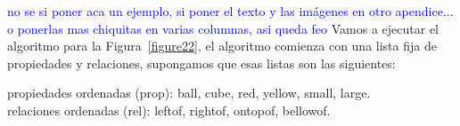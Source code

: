 \textcolor{blue}{no se si poner aca un ejemplo, si poner el texto y las im\'agenes en otro apendice... o ponerlas mas chiquitas en varias columnas, asi queda feo}
Vamos a ejecutar el algoritmo para la Figura~\ref{figure22},
el algoritmo comienza con una lista fija de propiedades y relaciones, supongamos que
esas listas son las siguientes:

propiedades ordenadas (prop): \textsf{ball}, \textsf{cube}, \textsf{red}, \textsf{yellow}, \textsf{small}, \textsf{large}.\\
relaciones ordenadas (rel): \textsf{leftof}, \textsf{rightof}, \textsf{ontopof}, \textsf{bellowof}.





